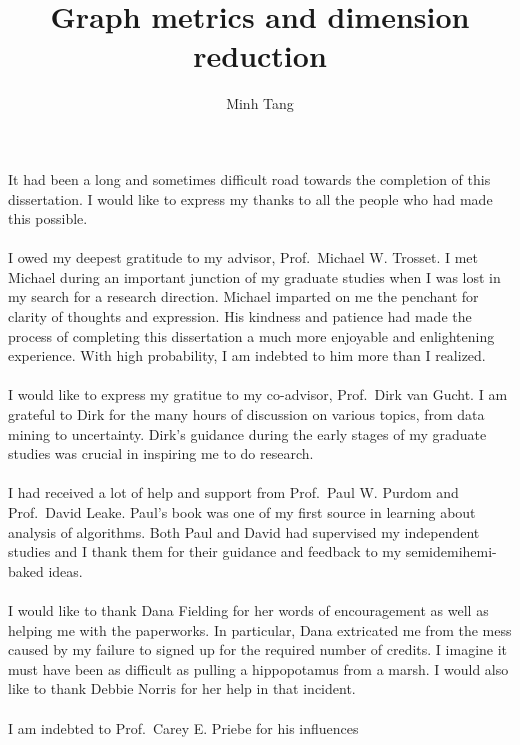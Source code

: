 \documentclass[reqno,final,ugsabstractsigs]{iuthesis}
\theoremstyle{definition}
\numberwithin{equation}{chapter}
\numberwithin{section}{chapter}
\begin{document}
\title{Graph metrics and dimension reduction}
\author{Minh Tang}
\setcounter{page}{2}
%
\begin{acknowledgements}
  It had been a long and sometimes difficult road towards the
  completion of this dissertation. I would like to express my thanks
  to all the people who had made this possible. \\ \\
%
  \noindent I owed my deepest gratitude to my advisor, Prof.~Michael
  W.  Trosset. I met Michael during an important junction of my
  graduate studies when I was lost in my search for a research
  direction.  Michael imparted on me the penchant for clarity of
  thoughts and expression. His kindness and patience had made the
  process of completing this dissertation a much more enjoyable and
  enlightening experience. With high probability, I am indebted to him
  more than I
  realized. \\ \\
%
  \noindent I would like to express my gratitue to my co-advisor,
  Prof.~Dirk van Gucht. I am grateful to Dirk for the many hours of
  discussion on various topics, from data mining to
  uncertainty. Dirk's guidance during the early stages of my graduate
  studies was crucial in
  inspiring me to do research. \\ \\
%
  \noindent I had received a lot of help and support from Prof.~Paul
  W. Purdom and Prof.~David Leake. Paul's book was one of my first
  source in learning about analysis of algorithms. Both Paul and David
  had supervised my independent studies and I thank them for their
  guidance and feedback to my semidemihemi-baked ideas. \\ \\
%
  \noindent I would like to thank Dana Fielding for her words of
  encouragement as well as helping me with the paperworks. In
  particular, Dana extricated me from the mess caused by my failure to
  signed up for the required number of credits. I imagine it must have
  been as difficult as pulling a hippopotamus from a marsh. I would
  also like to thank
  Debbie Norris for her help in that incident. \\ \\
%
  \noindent I am indebted to Prof.~Carey E. Priebe for his influences

\end{acknowledgements}
\end{document}
